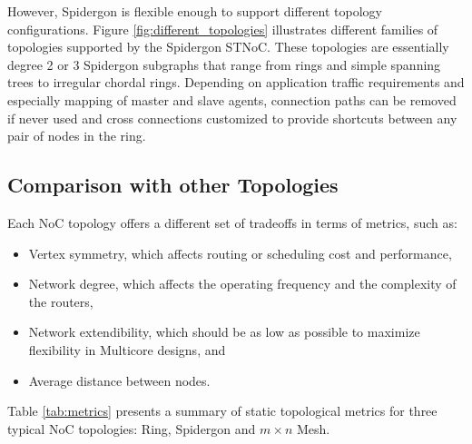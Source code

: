 However, Spidergon is flexible enough to support different topology configurations. 
Figure \ref{fig:different_topologies} illustrates different families of topologies supported by the Spidergon STNoC. 
These topologies are essentially degree 2 or 3 Spidergon subgraphs that range from rings and simple spanning trees to irregular chordal rings. 
Depending on application traffic requirements and especially mapping of master and slave agents, connection paths can be removed if never used and cross connections customized to provide shortcuts between any pair of nodes in the ring.

\subsection{Comparison with other Topologies}\label{S:metrics}

Each NoC topology offers a different set of tradeoffs in terms of metrics, such as:
\begin{itemize}
\item Vertex symmetry, which affects routing or scheduling cost and performance,
\item Network degree, which affects the operating frequency and the complexity of the routers,
\item Network extendibility, which should be as low as possible to maximize flexibility in Multicore designs, and 
\item Average distance between nodes.
\end{itemize}

Table \ref{tab:metrics} presents a summary of static topological metrics for three typical NoC topologies: Ring, Spidergon and ${m \times n}$ Mesh.

